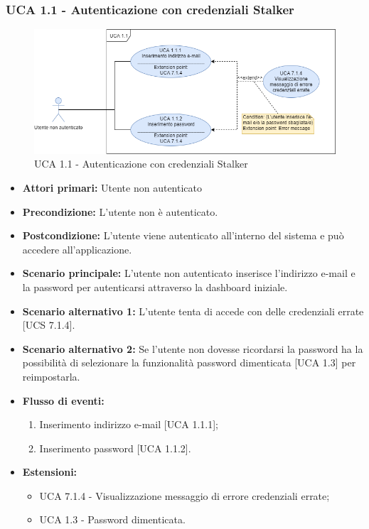 \subsubsection{UCA 1.1 - Autenticazione con credenziali Stalker}%

\begin{figure}[h]

  \centering
    \includegraphics[scale=0.5]{sezioni/UseCase/Immagini/UCA1.1.png}
  \caption{UCA 1.1 - Autenticazione con credenziali Stalker}
\end{figure}

\begin{itemize}
\item \textbf{Attori primari:} Utente non autenticato
\item \textbf{Precondizione:} L'utente non è autenticato.
\item \textbf{Postcondizione:} L'utente viene autenticato all'interno del sistema e può accedere all'applicazione.
\item \textbf{Scenario principale:} L'utente non autenticato inserisce l'indirizzo e-mail e la password per autenticarsi attraverso la dashboard iniziale.%
\item \textbf{Scenario alternativo 1:} L'utente tenta di accede con delle credenziali errate [UCS 7.1.4].
\item \textbf{Scenario alternativo 2:} Se l'utente non dovesse ricordarsi la password ha la possibilità di selezionare la funzionalità password dimenticata [UCA 1.3] per reimpostarla.
\item \textbf{Flusso di eventi:} %
  \begin{enumerate}
        \item Inserimento indirizzo e-mail [UCA 1.1.1];
        \item Inserimento password [UCA 1.1.2].
    \end{enumerate}
\item \textbf{Estensioni:}
	\begin{itemize}
		\item UCA 7.1.4 - Visualizzazione messaggio di errore credenziali errate;
		\item UCA 1.3 - Password dimenticata.
	\end{itemize}
\end{itemize}

